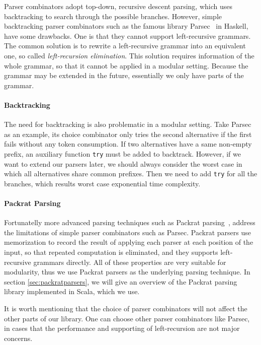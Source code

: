 Parser combinators adopt top-down, recursive descent parsing, which
uses backtracking to search through the possible branches. However,
simple backtracking parser combinators such as the famous library
Parsec~\cite{} in Haskell, have some drawbacks. One is that they cannot
support left-recursive grammars. The common solution is to rewrite a
left-recursive grammar into an equivalent one, so called
\textit{left-recursion elimination}. This solution requires
information of the whole grammar, so that it cannot be applied in a
modular setting. Because the grammar may be extended in the future,
essentially we only have parts of the grammar.

\paragraph{Backtracking} The need for backtracking is also problematic
in a modular setting. Take Parsec as an example, its choice
combinator only tries the second alternative if the first fails
without any token consumption. If two alternatives have a same
non-empty prefix, an auxiliary function \lstinline{try} must be added
to backtrack. However, if we want to extend our parsers later, we
should always consider the worst case in which all alternatives share
common prefixes. Then we need to add \lstinline{try} for all the
branches, which results worst case exponential time complexity.

\paragraph{Packrat Parsing}
Fortunatelly more advanced parsing techniques such as Packrat
parsing~\cite{}, address the limitations of simple parser combinators
such as Parsec. Packrat parsers use
memorization to record the result of applying each parser at each
position of the input, so that repeated computation is eliminated, and
they supports left-recursive grammars directly. All of these properties are very
suitable for modularity, thus we use Packrat parsers as the underlying
parsing technique. In section \ref{sec:packratparsers}, we will give
an overview of the Packrat parsing library implemented in Scala,
which we use.

It is worth mentioning that the choice of parser combinators will not
affect the other parts of our library. One can choose other parser
combinators like Parsec, in cases that the performance and supporting
of left-recursion are not major concerns.

